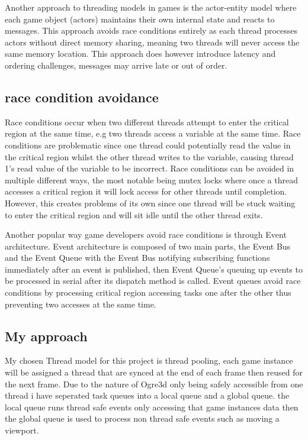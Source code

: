 \documentclass[]{final_report}
\begin{document}
Another approach to threading models in games is the actor-entity model where each game object (actors) maintains their own internal state and reacts to messages. This approach avoids race conditions entirely as each thread processes actors without direct memory sharing, meaning two threads will never access the same memory location. This approach does however introduce latency and ordering challenges, messages may arrive late or out of order.

\subsection{race condition avoidance}
Race conditions occur when two different threads attempt to enter the critical region at the same time, e.g two threads access a variable at the same time. Race conditions are problematic since one thread could potentially read the value in the critical region whilst the other thread writes to the variable, causing thread 1’s read value of the variable to be incorrect.
Race conditions can be avoided in multiple different ways, the most notable being mutex locks where once a thread accesses a critical region it will lock access for other threads until completion. However, this creates problems of its own since one thread will be stuck waiting to enter the critical region and will sit idle until the other thread exits.

Another popular way game developers avoid race conditions is through Event architecture. Event architecture is composed of two main parts, the Event Bus and the Event Queue with the Event Bus notifying subscribing functions immediately after an event is published, then Event Queue's queuing up events to be processed in serial after its dispatch method is called. Event queues avoid race conditions by processing critical region accessing tasks one after the other thus preventing two accesses at the same time. 

\subsection{My approach}
My chosen Thread model for this project is thread pooling, each game instance will be assigned a thread that are synced at the end of each frame then reused for the next frame. Due to the nature of Ogre3d only being safely accessible from one thread i have seperated task queues into a local queue and a global queue. the local queue runs thread safe events only accessing that game instances data then the global queue is used to process non thread safe events such as moving a viewport.
\end{document}
